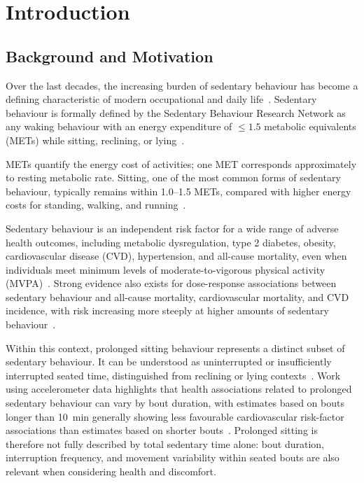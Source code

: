\chapter{Introduction}\label{ch:introduction}

\section{Background and Motivation}\label{sec:intro_background}

Over the last decades, the increasing burden of sedentary behaviour has become a defining characteristic of modern occupational and daily life~\citep{hadgraft2015excessive,reichel2022occupational}. Sedentary behaviour is formally defined by the Sedentary Behaviour Research Network as any waking behaviour with an energy expenditure of \(\le 1.5\) metabolic equivalents (METs) while sitting, reclining, or lying~\citep{sbrn2017terminology,sbrn2012standardized}.

METs quantify the energy cost of activities; one MET corresponds approximately to resting metabolic rate. Sitting, one of the most common forms of sedentary behaviour, typically remains within 1.0--1.5 METs, compared with higher energy costs for standing, walking, and running~\citep{ainsworth2000compendium,tremblay2010physiological}.

Sedentary behaviour is an independent risk factor for a wide range of adverse health outcomes, including metabolic dysregulation, type 2 diabetes, obesity, cardiovascular disease (CVD), hypertension, and all-cause mortality, even when individuals meet minimum levels of moderate-to-vigorous physical activity (MVPA)~\citep{owen2020sedentary,henschel2020sitting,katzmarzyk2019sedentary}. Strong evidence also exists for dose-response associations between sedentary behaviour and all-cause mortality, cardiovascular mortality, and CVD incidence, with risk increasing more steeply at higher amounts of sedentary behaviour~\citep{owen2020sedentary,katzmarzyk2019sedentary}.

Within this context, prolonged sitting behaviour represents a distinct subset of sedentary behaviour. It can be understood as uninterrupted or insufficiently interrupted seated time, distinguished from reclining or lying contexts~\citep{taylor2011prolonged_sitting}. Work using accelerometer data highlights that health associations related to prolonged sedentary behaviour can vary by bout duration, with estimates based on bouts longer than 10~min generally showing less favourable cardiovascular risk-factor associations than estimates based on shorter bouts~\citep{kim2015extracting}. Prolonged sitting is therefore not fully described by total sedentary time alone: bout duration, interruption frequency, and movement variability within seated bouts are also relevant when considering health and discomfort.

